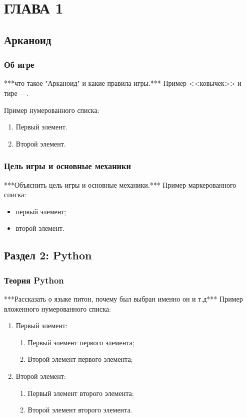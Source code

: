 \chapter{\label{ch:ch01}ГЛАВА 1} %

\section{\label{sec:ch01/sec01} Арканоид}

\subsection{\label{subsec:ch01/sec01/sub01}Об игре}
***что такое "Арканоид" и какие правила игры.***
Пример <<ковычек>> и тире ---.

Пример нумерованного списка:
\begin{enumerate}
\item Первый элемент.
\item Второй элемент.
\end{enumerate}

\subsection{\label{subsec:ch01/sec01/sub02}Цель игры и основные механики}
***Объяснить цель игры и основные механики.***
Пример маркерованного списка:
\begin{itemize}
\item первый элемент;
\item второй элемент.
\end{itemize}

\section{\label{sec:ch01/sec02}Раздел 2: Python}
    
\subsection{\label{subsec:ch01/sec02/sub01}Теория Python}
***Рассказать о языке питон, почему был выбран именно он и т.д***
Пример вложенного нумерованного списка:
\begin{enumerate}
\item Первый элемент:
\begin{enumerate}
\item Первый элемент первого элемента;
\item Второй элемент первого элемента;
\end{enumerate}
\item Второй элемент:
\begin{enumerate}
\item Первый элемент второго элемента;
\item Второй элемент второго элемента.
\end{enumerate}
\end{enumerate}

